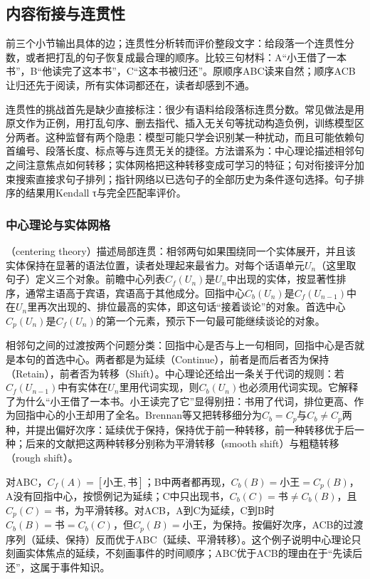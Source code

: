 \subsection{内容衔接与连贯性}
\label{sec:nlp-analysis-coherence}

前三个小节输出具体的边；连贯性分析转而评价整段文字：给段落一个连贯性分数，或者把打乱的句子恢复成最合理的顺序。比较三句材料：A“小王借了一本书”，B“他读完了这本书”，C“这本书被归还”。原顺序ABC读来自然；顺序ACB让归还先于阅读，所有实体词都还在，读者却感到不通。

连贯性的挑战首先是缺少直接标注：很少有语料给段落标连贯分数。常见做法是用原文作为正例，用打乱句序、删去指代、插入无关句等扰动构造负例，训练模型区分两者。这种监督有两个隐患：模型可能只学会识别某一种扰动，而且可能依赖句首编号、段落长度、标点等与连贯无关的捷径。方法谱系为：中心理论描述相邻句之间注意焦点如何转移；实体网格把这种转移变成可学习的特征；句对衔接评分加束搜索直接求句子排列；指针网络以已选句子的全部历史为条件逐句选择。句子排序的结果用Kendall τ与完全匹配率评价。

\subsubsection{中心理论与实体网格}
\label{sec:nlp-analysis-entity-grid}

（centering theory）描述局部连贯：相邻两句如果围绕同一个实体展开，并且该实体保持在显著的语法位置，读者处理起来最省力。对每个话语单元$U_n$（这里取句子）定义三个对象。前瞻中心列表$C_f(U_n)$是$U_n$中出现的实体，按显著性排序，通常主语高于宾语，宾语高于其他成分。回指中心$C_b(U_n)$是$C_f(U_{n-1})$中在$U_n$里再次出现的、排位最高的实体，即这句话“接着谈论”的对象。首选中心$C_p(U_n)$是$C_f(U_n)$的第一个元素，预示下一句最可能继续谈论的对象。

相邻句之间的过渡按两个问题分类：回指中心是否与上一句相同，回指中心是否就是本句的首选中心。两者都是为延续（Continue），前者是而后者否为保持（Retain），前者否为转移（Shift）。中心理论还给出一条关于代词的规则：若$C_f(U_{n-1})$中有实体在$U_n$里用代词实现，则$C_b(U_n)$也必须用代词实现。它解释了为什么“小王借了一本书。小王读完了它”显得别扭：书用了代词，排位更高、作为回指中心的小王却用了全名。Brennan等又把转移细分为$C_b=C_p$与$C_b\neq C_p$两种，并提出偏好次序：延续优于保持，保持优于前一种转移，前一种转移优于后一种；后来的文献把这两种转移分别称为平滑转移（smooth shift）与粗糙转移（rough shift）。

对ABC，$C_f(A)=[\text{小王},\text{书}]$；B中两者都再现，$C_b(B)=\text{小王}=C_p(B)$，A没有回指中心，按惯例记为延续；C中只出现书，$C_b(C)=\text{书}\neq C_b(B)$，且$C_p(C)=\text{书}$，为平滑转移。对ACB，A到C为延续，C到B时$C_b(B)=\text{书}=C_b(C)$，但$C_p(B)=\text{小王}$，为保持。按偏好次序，ACB的过渡序列（延续、保持）反而优于ABC（延续、平滑转移）。这个例子说明中心理论只刻画实体焦点的延续，不刻画事件的时间顺序；ABC优于ACB的理由在于“先读后还”，这属于事件知识。

